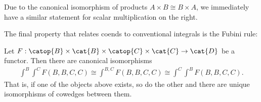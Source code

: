 Due to the canonical isomorphism of products $A\times B\cong B\times A$,
we immediately have a similar statement for scalar multiplication on the right.

The final property that relates coends to conventional integrals is
the Fubini rule:

\begin{theorem}\label{thm:fubini}
  Let $F:\catop{B}\times\cat{B}\times\catop{C}\times\cat{C}\to\cat{D}$ be a functor.
  Then there are canonical isomorphisms
  \begin{align*}
    \int^{B}\int^{C} F(B,B,C,C)
    \cong \int^{B,C} F(B,B,C,C)
    \cong \int^{C}\int^{B} F(B,B,C,C).
  \end{align*}
  That is, if one of the objects above exists, so do the other and there are
  unique isomorphisms of cowedges between them.
\end{theorem}

